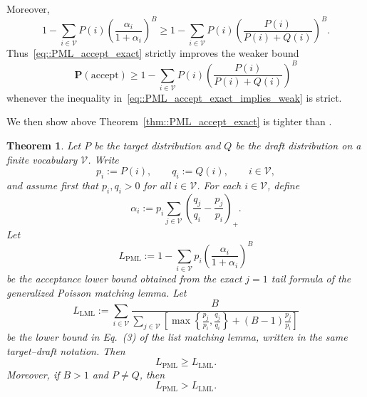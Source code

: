 \documentclass{article}
\theoremstyle{plain}
\newtheorem{theorem}{Theorem}[section]
\theoremstyle{definition}
\begin{document}
Moreover,
\begin{equation}
    \label{eq::PML_accept_exact_implies_weak}
    1-\sum_{i\in\mathcal V}
    P(i)
    \left(
        \frac{\alpha_i}{1+\alpha_i}
    \right)^B
    \ge
    1-\sum_{i\in\mathcal V}
    P(i)
    \left(
        \frac{P(i)}{P(i)+Q(i)}
    \right)^B .
\end{equation}
Thus~\eqref{eq::PML_accept_exact} strictly improves the weaker bound
\[
    \mathbf P(\mathrm{accept}) \ge
    1-\sum_{i\in\mathcal V} P(i)
    \left(
        \frac{P(i)}{P(i)+Q(i)}
    \right)^B
\]
whenever the inequality in~\eqref{eq::PML_accept_exact_implies_weak} is strict.


We then show above Theorem~\ref{thm::PML_accept_exact} is tighter than \citep[Proposition 2]{rowan2025list}. 

\begin{theorem}
\label{thm::exact_PML_dominates_LML}
Let $P$ be the target distribution and $Q$ be the draft distribution on a finite
vocabulary $\mathcal V$. Write
\[
    p_i := P(i),\qquad q_i := Q(i),\qquad i\in\mathcal V,
\]
and assume first that $p_i,q_i>0$ for all $i\in\mathcal V$. For each
$i\in\mathcal V$, define
\[
    \alpha_i
    :=
    p_i\sum_{j\in\mathcal V}
    \left(
        \frac{q_j}{q_i}-\frac{p_j}{p_i}
    \right)_+ .
\]
Let
\[
    L_{\mathrm{PML}}
    :=
    1-\sum_{i\in\mathcal V}
    p_i
    \left(
        \frac{\alpha_i}{1+\alpha_i}
    \right)^B
\]
be the acceptance lower bound obtained from the exact $j=1$ tail formula of the
generalized Poisson matching lemma. Let
\[
    L_{\mathrm{LML}}
    :=
    \sum_{i\in\mathcal V}
    \frac{B}{
    \sum_{j\in\mathcal V}
    \left[
        \max\left\{
            \frac{p_j}{p_i},
            \frac{q_j}{q_i}
        \right\}
        +(B-1)\frac{p_j}{p_i}
    \right]}
\]
be the lower bound in Eq.~(3) of the list matching lemma, written in the same
target--draft notation. Then
\[
    L_{\mathrm{PML}}\ge L_{\mathrm{LML}}.
\]
Moreover, if $B>1$ and $P\neq Q$, then
\[
    L_{\mathrm{PML}}>L_{\mathrm{LML}}.
\]
\end{theorem}
\end{document}
